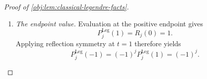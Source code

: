 \documentclass[11pt]{article}
\begin{document}
\begin{proof}[Proof of \cref{obj:lem:classical-legendre-facts}]
\begin{enumerate}
Differentiation of the energy, followed by substitution of this differential equation, yields
\[
\begin{aligned}
\mathcal E_j'(x)
&=2R_j(x)R_j'(x)
+\frac{(1-2x)R_j'(x)^2
       +2x(1-x)R_j'(x)R_j''(x)}{\lambda_j}\\
&=(2x-1)\frac{R_j'(x)^2}{\lambda_j}.
\end{aligned}
\]
Thus the energy is nonincreasing on \([0,1/2]\) and nondecreasing on \([1/2,1]\). Its endpoint values are
\[
\mathcal E_j(0)=R_j(0)^2=1,
\qquad
\mathcal E_j(1)=R_j(1)^2=1.
\]
For \(x\le1/2\), compare with the left endpoint; for \(x>1/2\), compare with the right endpoint. These comparisons give
\[
\mathcal E_j(x)\le
\begin{cases}
\mathcal E_j(0),&0\le x\le1/2,\\
\mathcal E_j(1),&1/2<x\le1,
\end{cases}
\qquad
\mathcal E_j(x)\le1.
\]
Since the additional term in the energy is nonnegative on the unit interval,
\[
R_j(x)^2
\le R_j(x)^2+\frac{x(1-x)R_j'(x)^2}{\lambda_j}
=\mathcal E_j(x)\le1,
\qquad 0\le x\le1.
\]
Hence \(|R_j(x)|\le1\) throughout that interval. Finally,
\[
-1\le t\le1
\quad\Longrightarrow\quad
0\le\frac{1-t}{2}\le1
\quad\Longrightarrow\quad
|P_j^{\mathrm{Leg}}(t)|
=\left|R_j\!\left(\frac{1-t}{2}\right)\right|\le1.
\]

\item \emph{The endpoint value.}
Evaluation at the positive endpoint gives
\[
P_j^{\mathrm{Leg}}(1)=R_j(0)=1.
\]
Applying reflection symmetry at \(t=1\) therefore yields
\[
P_j^{\mathrm{Leg}}(-1)
=(-1)^jP_j^{\mathrm{Leg}}(1)
=(-1)^j.
\]
\end{enumerate}
\end{proof}
\end{document}
